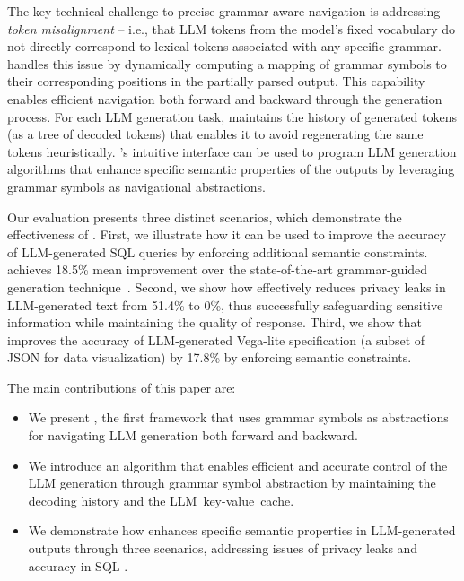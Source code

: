 The key technical challenge to precise grammar-aware navigation is addressing
\textit{token misalignment} -- i.e., that LLM tokens from the model's fixed vocabulary do not directly correspond to lexical tokens associated with any specific grammar.
%
\Tool{} handles this issue by dynamically computing a mapping of grammar symbols to their corresponding positions in the partially parsed output. 
This capability enables efficient navigation both forward and backward through the generation process.
For each LLM generation task, \Tool{} maintains the history of generated tokens (as a tree of decoded tokens) that enables it to avoid regenerating the same tokens heuristically. 
\Tool{}'s intuitive interface can be used to program LLM generation algorithms that enhance specific semantic properties of the outputs by leveraging grammar symbols as navigational abstractions.

Our evaluation presents three distinct scenarios, which demonstrate the effectiveness of \Tool{}. 
First, we illustrate how it can be used to improve the accuracy of LLM-generated SQL queries by enforcing additional semantic constraints.
\Tool{} achieves 18.5\% mean improvement over the state-of-the-art grammar-guided generation technique~\cite{ugare2024syncodellmgenerationgrammar}.
Second, we show how \Tool{} effectively reduces privacy leaks in LLM-generated text from 51.4\% to 0\%, thus successfully safeguarding sensitive information while maintaining the quality of response.
Third, we show that \Tool{} improves the accuracy of LLM-generated Vega-lite specification (a subset of JSON for data visualization) by 17.8\% by enforcing semantic constraints. 

 The main contributions of this paper are:

\vspace{-.06in} \begin{itemize}[leftmargin=*]
\itemsep 1pt 
\parskip 2pt 
%
\item We present \Tool{}, the first framework that uses grammar symbols as abstractions for navigating LLM generation both forward and backward. 

\item We introduce an algorithm that enables efficient and accurate control of the LLM generation through grammar symbol abstraction by maintaining the decoding history and the \mbox{LLM key-value cache.}

\item We demonstrate how \Tool{} enhances specific semantic properties in LLM-generated outputs through three scenarios, addressing issues of privacy leaks and accuracy in SQL . \end{itemize}

